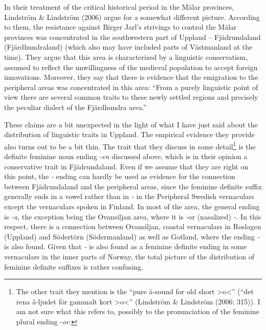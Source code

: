In their treatment of the critical historical period in the Mälar provinces, Lindström \& Lindström (2006) argue for a somewhat different picture. According to them, the resistance against Birger Jarl’s strivings to control the Mälar provinces was concentrated in the southwestern part of Uppland – Fjädrundaland (Fjärdhundraland) (which also may have included parts of Västmanland at the time). They argue that this area is characterized by a linguistic conservatism, assumed to reflect the unwillingness of the medieval population to accept foreign innovations. Moreover, they say that there is evidence that the emigration to the peripheral areas was concentrated in this area: “From a purely linguistic point of view there are several common traits to these newly settled regions and precisely the peculiar dialect of the Fjärdhundra area.”


These claims are a bit unexpected in the light of what I have just said about the distribution of linguistic traits in Uppland. The empirical evidence they provide also turns out to be a bit thin. The trait that they discuss in some detail\footnote{ The other trait they mention is the “pure å-sound for old short {\textgreater}o{\textless}” (“det rena å-ljudet för gammalt kort {\textgreater}o{\textless}” (Lindström \& Lindström (2006: 315)). I am not sure what this refers to, possibly to the pronunciation of the feminine plural ending -\textit{o}\textit{r}.} is the definite feminine noun ending \textit{{}-en} discussed above, which is in their opinion a conservative trait in Fjädrundaland. Even if we assume that they are right on this point, the\textit{ {}-} ending can hardly be used as evidence for the connection between Fjädrundaland and the peripheral areas, since the feminine definite suffix generally ends in a vowel rather than in\textit{ {}-} in the Peripheral Swedish vernaculars except the vernaculars spoken in Finland.  In most of the area, the general ending is\textit{ {}-a}, the exception being the Ovansiljan area, where it is\textit{ {}-}or (nasalized)\textit{ {}-}. In this respect, there is a connection between Ovansiljan, coastal vernaculars in Roslagen (Uppland) and Södertörn (Södermanland) as well as Gotland, where the ending\textit{ {}-} is also found. Given that\textit{ {}-} is also found as a feminine definite ending in some vernaculars in the inner parts of Norway, the total picture of the distribution of feminine definite suffixes is rather confusing. 

